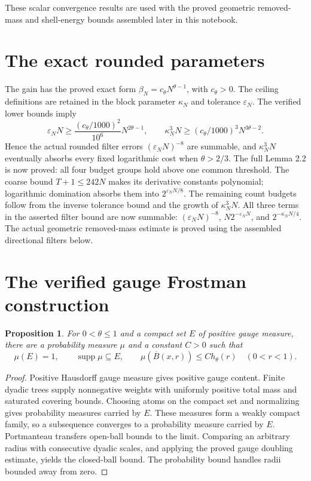 \documentclass[11pt]{article}
\newtheorem{proposition}{Proposition}
\begin{document}
These scalar convergence results are used with the proved geometric
removed-mass and shell-energy bounds assembled later in this notebook.

\section*{The exact rounded parameters}
The gain has the proved exact form $\beta_N=c_\theta N^{\theta-1}$, with
$c_\theta>0$. The ceiling definitions are retained in the block parameter
$\kappa_N$ and tolerance $\varepsilon_N$. The verified lower bounds imply
\[
\varepsilon_N N\ge
\frac{(c_\theta/1000)^2}{10^6}N^{2\theta-1},
\qquad
\kappa_N^3N\ge(c_\theta/1000)^3N^{3\theta-2}.
\]
Hence the actual rounded filter errors $(\varepsilon_N N)^{-8}$ are
summable, and $\kappa_N^3N$ eventually absorbs every fixed logarithmic cost
when $\theta>2/3$. The full Lemma 2.2 is now proved: all four budget groups
hold above one common threshold. The coarse bound $T+1\le242N$ makes its
derivative constants polynomial; logarithmic domination absorbs them into
$2^{\varepsilon_NN/8}$. The remaining count budgets follow from the inverse
tolerance bound and the growth of $\kappa_N^3N$.
All three terms in the asserted filter bound are now summable:
$(\varepsilon_NN)^{-8}$, $N2^{-\varepsilon_NN}$, and
$2^{-\kappa_NN/4}$. The actual geometric removed-mass estimate is proved
using the assembled directional filters below.

\newpage
\section*{The verified gauge Frostman construction}
\begin{proposition}
For $0<\theta\le1$ and a compact set $E$ of positive gauge measure, there are
a probability measure $\mu$ and a constant $C>0$ such that
\[
\mu(E)=1,\qquad \operatorname{supp}\mu\subseteq E,\qquad
\mu(\overline B(x,r))\le C h_\theta(r)\quad(0<r<1).
\]
\end{proposition}
\begin{proof}
Positive Hausdorff gauge measure gives positive gauge content. Finite dyadic
trees supply nonnegative weights with uniformly positive total mass and
saturated covering bounds. Choosing atoms on the compact set and normalizing
gives probability measures carried by $E$. These measures form a weakly
compact family, so a subsequence converges to a probability measure carried
by $E$. Portmanteau transfers open-ball bounds to the limit. Comparing an
arbitrary radius with consecutive dyadic scales, and applying the proved
gauge doubling estimate, yields the closed-ball bound. The probability bound
handles radii bounded away from zero.
\end{proof}
\end{document}
